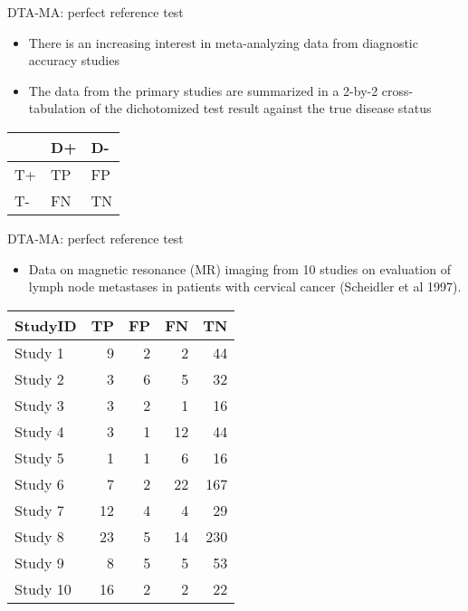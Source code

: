 \documentclass[
  ignorenonframetext,
  aspectratio=43,
]{beamer}
\providecommand{\tightlist}{%
  \setlength{\itemsep}{0pt}\setlength{\parskip}{0pt}}
\begin{document}
\begin{frame}{DTA-MA: perfect reference test}
\protect\hypertarget{dta-ma-perfect-reference-test}{}

\begin{itemize}
\item
  There is an increasing interest in meta-analyzing data from diagnostic
  accuracy studies
\item
  The data from the primary studies are summarized in a 2-by-2
  cross-tabulation of the dichotomized test result against the true
  disease status
\end{itemize}

\begin{table}[H]
\centering\begingroup\fontsize{10}{12}\selectfont

\begin{tabular}{l|l|l}
\hline
  & D+ & D-\\
\hline
T+ & TP & FP\\
\hline
T- & FN & TN\\
\hline
\end{tabular}
\endgroup{}
\end{table}

\end{frame}

\begin{frame}{DTA-MA: perfect reference test}
\protect\hypertarget{dta-ma-perfect-reference-test-1}{}

\begin{itemize}
\tightlist
\item
  Data on magnetic resonance (MR) imaging from 10 studies on evaluation
  of lymph node metastases in patients with cervical cancer (Scheidler
  et al 1997).
\end{itemize}

\begin{table}[H]
\centering\begingroup\fontsize{10}{12}\selectfont

\begin{tabular}{l|r|r|r|r}
\hline
StudyID & TP & FP & FN & TN\\
\hline
Study 1 & 9 & 2 & 2 & 44\\
\hline
Study 2 & 3 & 6 & 5 & 32\\
\hline
Study 3 & 3 & 2 & 1 & 16\\
\hline
Study 4 & 3 & 1 & 12 & 44\\
\hline
Study 5 & 1 & 1 & 6 & 16\\
\hline
Study 6 & 7 & 2 & 22 & 167\\
\hline
Study 7 & 12 & 4 & 4 & 29\\
\hline
Study 8 & 23 & 5 & 14 & 230\\
\hline
Study 9 & 8 & 5 & 5 & 53\\
\hline
Study 10 & 16 & 2 & 2 & 22\\
\hline
\end{tabular}
\endgroup{}
\end{table}

\end{frame}
\end{document}

